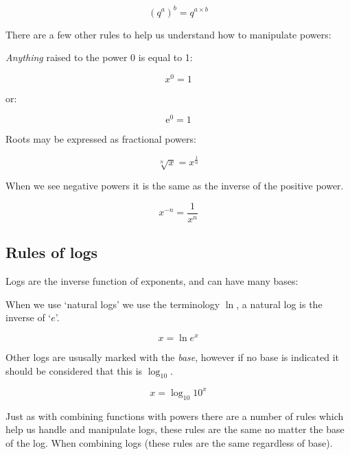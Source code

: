 \documentclass[
]{book}
\begin{document}
\begin{equation}
\left(q^a\right)^b =  q^{a\times b}
\label{eq:combpowerraise}
\end{equation}

There are a few other rules to help us understand how to manipulate powers:

\emph{Anything} raised to the power 0 is equal to 1:

\begin{equation*}
x^0=1
\end{equation*}

or:

\begin{equation*}
\textrm{e}^0=1
\end{equation*}

Roots may be expressed as fractional powers:

\begin{equation}
\sqrt[n]{x}=x^{\frac{1}{n}}
\label{eq:fracpower}
\end{equation}

When we see negative powers it is the same as the inverse of the positive power.

\begin{equation}
x^{-n}={\frac{1}{x^n}}
\label{eq:negpower}
\end{equation}

\hypertarget{sec:rulelog}{%
\subsection{Rules of logs}\label{sec:rulelog}}

Logs are the inverse function of exponents, and can have many bases:

When we use `natural logs' we use the terminology \(\ln\), a natural log is the inverse of `\(e\)'.

\begin{equation}
x = \ln e^x
\label{eq:natlog}
\end{equation}

Other logs are ususally marked with the \emph{base}, however if no base is indicated it should be considered that this is \(\log_{10}\).

\begin{equation}
x = \log_{10} 10^x
\label{eq:10log}
\end{equation}

Just as with combining functions with powers there are a number of rules which help us handle and manipulate logs, these rules are the same no matter the base of the log. When combining logs (these rules are the same regardless of base).
\end{document}
